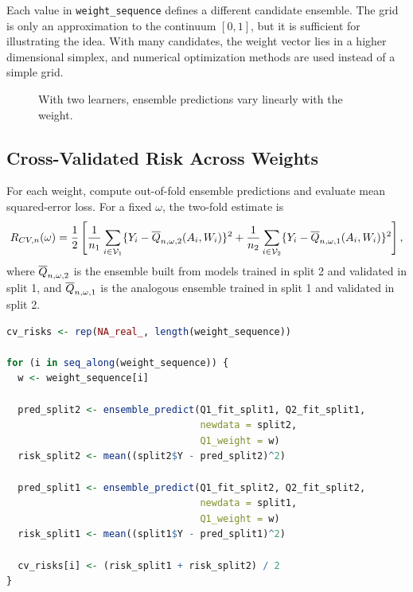 Each value in \texttt{weight\_sequence} defines a different candidate ensemble.
The grid is only an approximation to the continuum $[0,1]$, but it is sufficient for
illustrating the idea. With many candidates, the weight vector lies in a higher
dimensional simplex, and numerical optimization methods are used instead of a simple
grid.

\begin{figure}[H]
\centering
{}
\caption{With two learners, ensemble predictions vary linearly with the weight.}
\label{fig:ch6-weight-path}
\end{figure}

\subsection{Cross-Validated Risk Across Weights}

For each weight, compute out-of-fold ensemble predictions and evaluate mean
squared-error loss. For a fixed $\omega$, the two-fold estimate is
\[
R_{CV,n}(\omega)
=
\frac{1}{2}
\left[
\frac{1}{n_1}\sum_{i\in \mathcal V_1}
\{Y_i-\overline{Q}_{n,\omega,2}(A_i,W_i)\}^2
+
\frac{1}{n_2}\sum_{i\in \mathcal V_2}
\{Y_i-\overline{Q}_{n,\omega,1}(A_i,W_i)\}^2
\right],
\]
where $\overline{Q}_{n,\omega,2}$ is the ensemble built from models trained in split 2 and
validated in split 1, and $\overline{Q}_{n,\omega,1}$ is the analogous ensemble trained in
split 1 and validated in split 2.

\begin{implementationbox}
\begin{lstlisting}[language=R]
cv_risks <- rep(NA_real_, length(weight_sequence))

for (i in seq_along(weight_sequence)) {
  w <- weight_sequence[i]

  pred_split2 <- ensemble_predict(Q1_fit_split1, Q2_fit_split1,
                                  newdata = split2,
                                  Q1_weight = w)
  risk_split2 <- mean((split2$Y - pred_split2)^2)

  pred_split1 <- ensemble_predict(Q1_fit_split2, Q2_fit_split2,
                                  newdata = split1,
                                  Q1_weight = w)
  risk_split1 <- mean((split1$Y - pred_split1)^2)

  cv_risks[i] <- (risk_split1 + risk_split2) / 2
}
\end{lstlisting}
\end{implementationbox}

